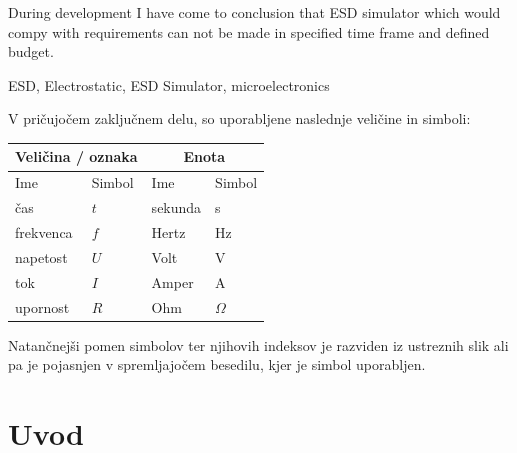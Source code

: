 \documentclass[a4paper,twoside,openright,12pt,Slovene]{book}
\begin{document}
During development I have come to conclusion that ESD simulator which would compy with requirements can not be made in specified time frame and defined budget.

\keywords
ESD, Electrostatic, ESD Simulator, microelectronics


\tableofcontents

\seznamslik
\seznamtabel

\seznamsimbolov
V pričujočem zaključnem delu, so uporabljene naslednje veličine in simboli:

\begin{center}
    \begin{tabular}{*{4}{l}} \hline
        \multicolumn{2}{c}{\bf{Veličina / oznaka}}           & \multicolumn{2}{c}{\bf{Enota}} \\ \hline
        Ime                & Simbol                          & Ime      & Simbol              \\ \hline
        čas                & $t$                             & sekunda  & s                   \\
        frekvenca          & $f$                             & Hertz    & Hz                  \\
        napetost           & $U$                             & Volt     & V                  \\
        tok                & $I$                             & Amper    & A                   \\
        upornost           & $R$                             & Ohm      & $\Omega$            \\ \hline

    \end{tabular}
\end{center} 

\noindent
Natančnejši pomen simbolov ter njihovih indeksov je razviden iz ustreznih slik ali pa je pojasnjen v spremljajočem besedilu, kjer je simbol uporabljen.

\mainmatter

\chapter{Uvod} \label{uvod}
\end{document}

